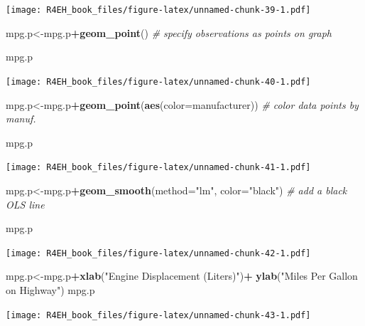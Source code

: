 \documentclass[]{book}
\newenvironment{Shaded}{\begin{snugshade}}{\end{snugshade}}
\newcommand{\KeywordTok}[1]{\textcolor[rgb]{0.13,0.29,0.53}{\textbf{#1}}}
\newcommand{\DataTypeTok}[1]{\textcolor[rgb]{0.13,0.29,0.53}{#1}}
\newcommand{\StringTok}[1]{\textcolor[rgb]{0.31,0.60,0.02}{#1}}
\newcommand{\CommentTok}[1]{\textcolor[rgb]{0.56,0.35,0.01}{\textit{#1}}}
\newcommand{\OperatorTok}[1]{\textcolor[rgb]{0.81,0.36,0.00}{\textbf{#1}}}
\newcommand{\NormalTok}[1]{#1}
\theoremstyle{definition}
\theoremstyle{definition}
\theoremstyle{definition}
\theoremstyle{remark}
\begin{document}
\texttt{[image: R4EH\_book\_files/figure-latex/unnamed-chunk-39-1.pdf]}

\begin{Shaded}
\begin{Highlighting}[]
\NormalTok{mpg.p<-mpg.p}\OperatorTok{+}\KeywordTok{geom_point}\NormalTok{() }\CommentTok{# specify observations as points on graph}

\NormalTok{mpg.p}
\end{Highlighting}
\end{Shaded}

\texttt{[image: R4EH\_book\_files/figure-latex/unnamed-chunk-40-1.pdf]}

\begin{Shaded}
\begin{Highlighting}[]
\NormalTok{mpg.p<-mpg.p}\OperatorTok{+}\KeywordTok{geom_point}\NormalTok{(}\KeywordTok{aes}\NormalTok{(}\DataTypeTok{color=}\NormalTok{manufacturer)) }\CommentTok{# color data points by manuf.}

\NormalTok{mpg.p}
\end{Highlighting}
\end{Shaded}

\texttt{[image: R4EH\_book\_files/figure-latex/unnamed-chunk-41-1.pdf]}

\begin{Shaded}
\begin{Highlighting}[]
\NormalTok{mpg.p<-mpg.p}\OperatorTok{+}\KeywordTok{geom_smooth}\NormalTok{(}\DataTypeTok{method=}\StringTok{"lm"}\NormalTok{, }\DataTypeTok{color=}\StringTok{"black"}\NormalTok{) }\CommentTok{# add a black OLS line }

\NormalTok{mpg.p}
\end{Highlighting}
\end{Shaded}

\texttt{[image: R4EH\_book\_files/figure-latex/unnamed-chunk-42-1.pdf]}

\begin{Shaded}
\begin{Highlighting}[]
\NormalTok{mpg.p<-mpg.p}\OperatorTok{+}\KeywordTok{xlab}\NormalTok{(}\StringTok{"Engine Displacement (Liters)"}\NormalTok{)}\OperatorTok{+}
\StringTok{  }\KeywordTok{ylab}\NormalTok{(}\StringTok{"Miles Per Gallon on Highway"}\NormalTok{)}
\NormalTok{mpg.p}
\end{Highlighting}
\end{Shaded}

\texttt{[image: R4EH\_book\_files/figure-latex/unnamed-chunk-43-1.pdf]}
\end{document}
